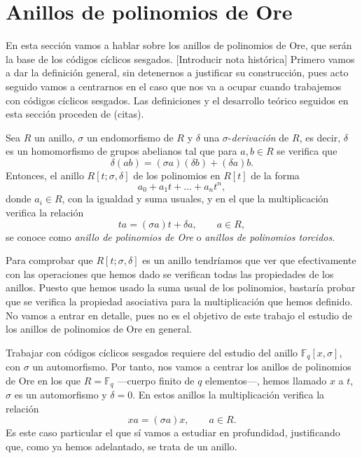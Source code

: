 \chapter{Anillos de polinomios de Ore}

En esta sección vamos a hablar sobre los anillos de polinomios de Ore, que serán la base de los códigos cíclicos sesgados.
[Introducir nota histórica]
Primero vamos a dar la definición general, sin detenernos a justificar su construcción, pues acto seguido vamos a centrarnos en el caso que nos va a ocupar cuando trabajemos con códigos cíclicos sesgados.
Las definiciones y el desarrollo teórico seguidos en esta sección proceden de (citas).

\begin{definition}
  Sea \(R\) un anillo, \(\sigma\) un endomorfismo de \(R\) y \(\delta\) una \(\sigma\)-\textit{derivación} de \(R\), es decir, \(\delta\) es un homomorfismo de grupos abelianos tal que para \(a, b \in R\) se verifica que
  \[
    \delta(ab) = (\sigma a)(\delta b) + (\delta a)b.
  \]
  Entonces, el anillo \(R[t; \sigma, \delta]\) de los polinomios en \(R[t]\) de la forma
  \[
    a_0 + a_1t + \dots + a_nt^n,
  \]
  donde \(a_i \in R\), con la igualdad y suma usuales, y en el que la multiplicación verifica la relación 
  \[
  ta = (\sigma a)t + \delta a, \qquad a \in R,
  \]
  se conoce como \textit{anillo de polinomios de Ore} o \textit{anillos de polinomios torcidos}.
\end{definition}

Para comprobar que \(R[t; \sigma, \delta]\) es un anillo tendríamos que ver que efectivamente con las operaciones que hemos dado se verifican todas las propiedades de los anillos.
Puesto que hemos usado la suma usual de los polinomios, bastaría probar que se verifica la propiedad asociativa para la multiplicación que hemos definido.
No vamos a entrar en detalle, pues no es el objetivo de este trabajo el estudio de los anillos de polinomios de Ore en general.

Trabajar con códigos cíclicos sesgados requiere del estudio del anillo \(\mathbb F_q[x, \sigma]\), con \(\sigma\) un automorfismo.
Por tanto, nos vamos a centrar los anillos de polinomios de Ore en los que \(R = \mathbb F_q\) —cuerpo finito de \(q\) elementos—, hemos llamado \(x\) a \(t\), \(\sigma\) es un automorfismo y \(\delta = 0\).
En estos anillos la multiplicación verifica la relación 
\[
  xa = (\sigma a)x, \qquad a \in R.
\]
Es este caso particular el que sí vamos a estudiar en profundidad, justificando que, como ya hemos adelantado, se trata de un anillo.

